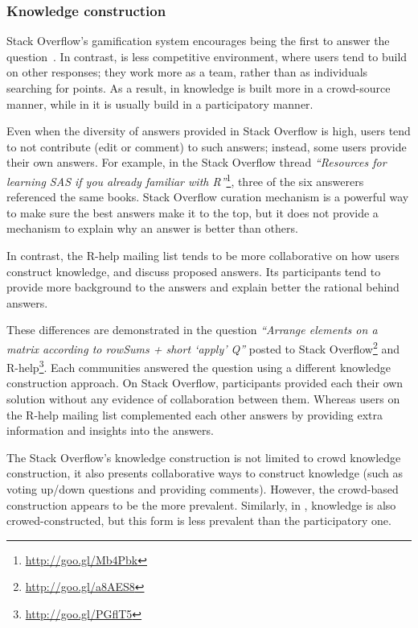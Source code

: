 \subsubsection{Knowledge construction}

Stack Overflow's gamification system encourages being the first to answer the question~\cite{Singer2013}. In contrast, \RH is less competitive environment,
where users tend to build on other
responses; they work more as a team, rather than as individuals searching for points.
As 
a result, in \SO knowledge is built more in a crowd-source manner, while in \RH it is usually build in a participatory manner.

Even when the diversity of answers provided in Stack Overflow is high, users tend to not contribute (edit or comment) to such answers; instead, some users provide their own answers.
    For example, in the Stack Overflow thread \textit{``Resources for learning SAS if you already familiar with R''}\footnote{\url{http://goo.gl/Mb4Pbk}}, three of the six answerers referenced the same books.
    Stack Overflow curation mechanism is a powerful way to make sure the best answers make it to the top, but it does not provide a mechanism to explain why an
    answer is better than others.

    In contrast, the R-help mailing list tends to be more collaborative on how users construct knowledge, and discuss proposed answers. Its
    participants tend to provide more background to the answers and explain better the rational behind answers.

These differences are demonstrated in the question \textit{``Arrange elements on a matrix according to rowSums + short `apply' Q''}  posted to  Stack Overflow\footnote{\url{http://goo.gl/a8AES8}} and {R-help}\footnote{\url{http://goo.gl/PGflT5}}.
    Each communities answered the question using a different knowledge construction approach.
    On Stack Overflow, participants provided each their own solution without any evidence of collaboration between them.
    Whereas users on the R-help mailing list complemented each other answers by providing extra information and insights into the answers.
    
    The Stack Overflow's knowledge construction is not limited to crowd knowledge construction, it also presents collaborative ways to construct knowledge (such
    as voting up/down questions and providing comments).
    However, the crowd-based construction appears to be the more prevalent.
    Similarly, in \RH, knowledge is also crowed-constructed, but this form is less prevalent than the participatory one.


